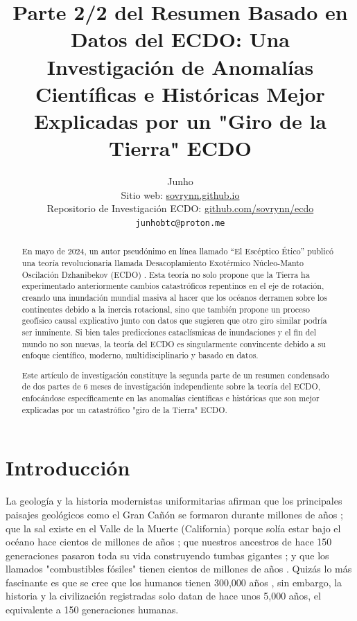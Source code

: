 \documentclass[10pt,twocolumn,letterpaper]{article}
\begin{document}
\title{Parte 2/2 del Resumen Basado en Datos del ECDO: Una Investigación de Anomalías Científicas e Históricas Mejor Explicadas por un "Giro de la Tierra" ECDO}

\author{Junho\\
Sitio web: \href{https://sovrynn.github.io}{sovrynn.github.io}\\
Repositorio de Investigación ECDO: \href{https://github.com/sovrynn/ecdo}{github.com/sovrynn/ecdo}\\
{\tt\small junhobtc@proton.me}
}

\maketitle

\begin{abstract}
En mayo de 2024, un autor pseudónimo en línea llamado “El Escéptico Ético” \cite{0} publicó una teoría revolucionaria llamada Desacoplamiento Exotérmico Núcleo-Manto Oscilación Dzhanibekov (ECDO) \cite{1}. Esta teoría no solo propone que la Tierra ha experimentado anteriormente cambios catastróficos repentinos en el eje de rotación, creando una inundación mundial masiva al hacer que los océanos derramen sobre los continentes debido a la inercia rotacional, sino que también propone un proceso geofísico causal explicativo junto con datos que sugieren que otro giro similar podría ser inminente. Si bien tales predicciones cataclísmicas de inundaciones y el fin del mundo no son nuevas, la teoría del ECDO es singularmente convincente debido a su enfoque científico, moderno, multidisciplinario y basado en datos.

Este artículo de investigación constituye la segunda parte de un resumen condensado de dos partes de 6 meses de investigación independiente \cite{2,20} sobre la teoría del ECDO, enfocándose específicamente en las anomalías científicas e históricas que son mejor explicadas por un catastrófico "giro de la Tierra" ECDO.

\end{abstract}


\section{Introducción}

La geología y la historia modernistas uniformitarias afirman que los principales paisajes geológicos como el Gran Cañón se formaron durante millones de años \cite{143}; que la sal existe en el Valle de la Muerte (California) porque solía estar bajo el océano hace cientos de millones de años \cite{144}; que nuestros ancestros de hace 150 generaciones pasaron toda su vida construyendo tumbas gigantes \cite{29,70}; y que los llamados "combustibles fósiles" tienen cientos de millones de años \cite{104}. Quizás lo más fascinante es que se cree que los humanos tienen 300,000 años \cite{145}, sin embargo, la historia y la civilización registradas solo datan de hace unos 5,000 años, el equivalente a 150 generaciones humanas.
\end{document}
